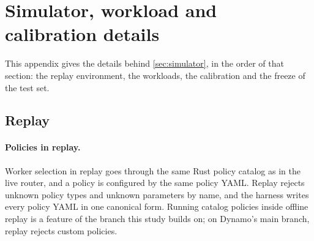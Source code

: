 %

\section{Simulator, workload and calibration details}
\label{app:sim}

This appendix gives the details behind \cref{sec:simulator}, in the order of that section: the
replay environment, the workloads, the calibration and the freeze of the test set.

\subsection{Replay}

\paragraph{Policies in replay.}
Worker selection in replay goes through the same Rust policy catalog as in the live router, and a
policy is configured by the same policy YAML. Replay rejects unknown policy types and unknown
parameters by name, and the harness writes every policy YAML in one canonical form. Running catalog
policies inside offline replay is a feature of the branch this study builds on; on Dynamo's
main branch, replay rejects custom policies.

